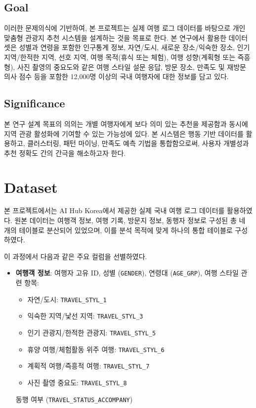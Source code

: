 \documentclass[sigconf]{acmart}
\begin{document}
\begin{CJK}{UTF8}{mj}
\subsection{Goal}

이러한 문제의식에 기반하여, 본 프로젝트는 실제 여행 로그 데이터를 바탕으로 개인 맞춤형 관광지 추천 시스템을 설계하는 것을 목표로 한다. 본 연구에서 활용한 데이터셋은 성별과 연령을 포함한 인구통계 정보, 자연/도시, 새로운 장소/익숙한 장소, 인기 지역/한적한 지역, 선호 지역, 여행 목적(휴식 또는 체험), 여행 성향(계획형 또는 즉흥형), 사진 촬영의 중요도와 같은 여행 스타일 설문 응답, 방문 장소, 만족도 및 재방문 의사 점수 등을 포함한 12,000명 이상의 국내 여행자에 대한 정보를 담고 있다.

\subsection{Significance}

본 연구 설계 목표의 의의는 개별 여행자에게 보다 의미 있는 추천을 제공함과 동시에 지역 관광 활성화에 기여할 수 있는 가능성에 있다. 본 시스템은 행동 기반 데이터를 활용하고, 클러스터링, 패턴 마이닝, 만족도 예측 기법을 통합함으로써, 사용자 개별성과 추천 정확도 간의 간극을 해소하고자 한다.



\section{Dataset} %

본 프로젝트에서는 AI Hub Korea에서 제공한 실제 국내 여행 로그 데이터를 활용하였다. 원본 데이터는 여행객 정보, 여행 기록, 방문지 정보, 동행자 정보로 구성된 총 네 개의 테이블로 분산되어 있었으며, 이를 분석 목적에 맞게 하나의 통합 테이블로 구성하였다.

이 과정에서 다음과 같은 주요 컬럼을 선별하였다.

\begin{itemize}
  \item \textbf{여행객 정보}: 여행자 고유 ID, 성별 (\texttt{GENDER}), 연령대 (\texttt{AGE\_GRP}), 여행 스타일 관련 항목:
  \begin{itemize}
    \item 자연/도시: \texttt{TRAVEL\_STYL\_1}
    \item 익숙한 지역/낯선 지역: \texttt{TRAVEL\_STYL\_3}
    \item 인기 관광지/한적한 관광지: \texttt{TRAVEL\_STYL\_5}
    \item 휴양 여행/체험활동 위주 여행: \texttt{TRAVEL\_STYL\_6}
    \item 계획적 여행/즉흥적 여행: \texttt{TRAVEL\_STYL\_7}
    \item 사진 촬영 중요도: \texttt{TRAVEL\_STYL\_8}
  \end{itemize}
  동행 여부 (\texttt{TRAVEL\_STATUS\_ACCOMPANY})
  

\end{itemize}
\end{CJK}
\end{document}
